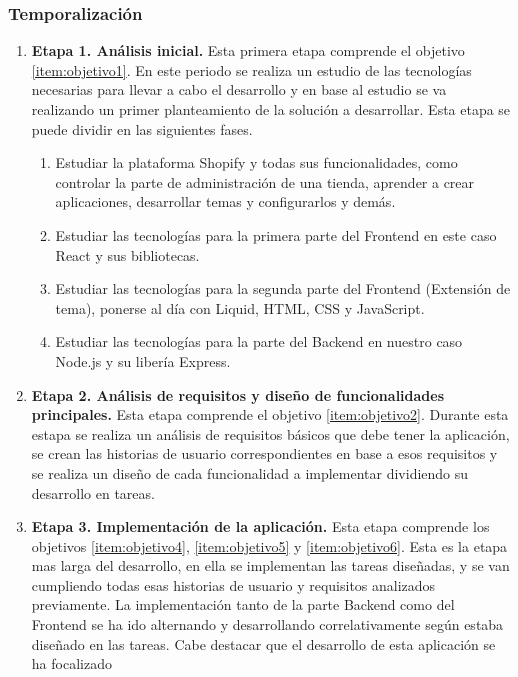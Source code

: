 \documentclass[12pt]{article}
\begin{document}
\subsubsection{Temporalización}

\begin{enumerate}[label={\textbf{\textbullet}}]
    \item \textbf{Etapa 1. Análisis inicial.} Esta primera etapa comprende el objetivo \ref{item:objetivo1}. En este periodo se realiza un estudio de las tecnologías
    necesarias para llevar a cabo el desarrollo y en base al estudio se va realizando un primer planteamiento de la solución a desarrollar. Esta etapa se puede dividir en las siguientes fases.
    \begin{enumerate}
        \item Estudiar la plataforma Shopify y todas sus funcionalidades, como controlar la parte de administración de una tienda, aprender a crear aplicaciones, desarrollar temas y configurarlos y demás.
        \item Estudiar las tecnologías para la primera parte del Frontend en este caso React y sus bibliotecas.
        \item Estudiar las tecnologías para la segunda parte del Frontend (Extensión de tema), ponerse al día con Liquid, HTML, CSS y JavaScript.
        \item Estudiar las tecnologías para la parte del Backend en nuestro caso Node.js y su libería Express. 
    \end{enumerate}
    \item \textbf{Etapa 2. Análisis de requisitos y diseño de funcionalidades principales.} Esta etapa comprende el objetivo \ref{item:objetivo2}.
    Durante esta estapa se realiza un análisis de requisitos básicos que debe tener la aplicación, se crean las historias de usuario correspondientes en base a esos requisitos y se realiza un diseño de cada
    funcionalidad a implementar dividiendo su desarrollo en tareas.
    \item \textbf{Etapa 3. Implementación de la aplicación.} Esta etapa comprende los objetivos \ref{item:objetivo4}, \ref{item:objetivo5} y \ref{item:objetivo6}.
    Esta es la etapa mas larga del desarrollo, en ella se implementan las tareas diseñadas, y se van cumpliendo todas esas historias de usuario y requisitos analizados previamente.
    La implementación tanto de la parte Backend como del Frontend se ha ido alternando y desarrollando correlativamente según estaba diseñado en las tareas. Cabe destacar que el desarrollo de esta aplicación se ha focalizado

\end{enumerate}
\end{document}
